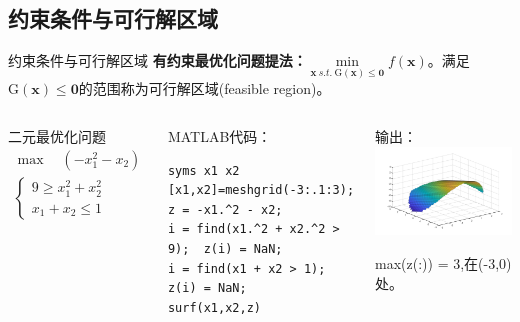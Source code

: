 \documentclass[12pt]{beamer}
\begin{document}
	\subsection{约束条件与可行解区域}
		\begin{frame}[fragile]{约束条件与可行解区域}
			\textbf{有约束最优化问题提法：}$\min\limits_{\mathbf{x}\ s.t.\ \mathrm{G}(\mathbf{x}) \leqslant \mathbf{0}} f(\mathbf{x})$。满足$\mathrm{G}(\mathbf{x}) \leqslant \mathbf{0}$的范围称为可行解区域(feasible region)。
			
		\begin{columns}[T]
				
		\begin{example}[6-15]
			二元最优化问题$
			\begin{array}{l}
			\max \quad \left(-x_{1}^{2}-x_{2}\right)\\
			\left\{\begin{array}{l}
			9 \geqslant x_{1}^{2}+x_{2}^{2} \\
			x_{1}+x_{2} \leqslant 1
			\end{array}\right.
			\end{array}
			$
		\end{example}
				
	\begin{block}{MATLAB代码：}
\begin{lstlisting}
syms x1 x2
[x1,x2]=meshgrid(-3:.1:3);
z = -x1.^2 - x2;
i = find(x1.^2 + x2.^2 > 9);  z(i) = NaN;
i = find(x1 + x2 > 1);  z(i) = NaN;
surf(x1,x2,z)
\end{lstlisting}
	\end{block}	
				
				
	\begin{block}{输出：}
\centering
\includegraphics[width=\textwidth]{31}

max(z(:)) = 3,在(-3,0)处。
	\end{block}
		\end{columns}			
\end{frame}
\end{document}

